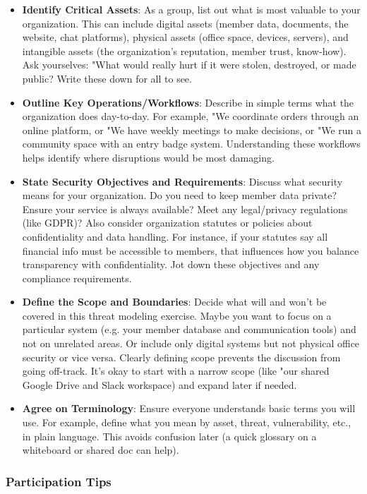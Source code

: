 \begin{itemize}
    \item \textbf{Identify Critical Assets}: As a group, list out what is most
valuable to your organization. This can include digital assets (member data,
documents, the website, chat platforms), physical assets (office space, devices,
servers), and intangible assets (the organization's reputation, member trust, know-how).
Ask yourselves: "What would really hurt if it were stolen, destroyed, or made
public? Write these down for all to see.
    \item \textbf{Outline Key Operations/Workflows}: Describe in simple terms
what the organization does day-to-day. For example, "We coordinate orders through an
online platform, or "We have weekly meetings to make decisions, or "We run a
community space with an entry badge system. Understanding these workflows helps
identify where disruptions would be most damaging.
    \item \textbf{State Security Objectives and Requirements}: Discuss what
security means for your organization. Do you need to keep member data private? Ensure
your service is always available? Meet any legal/privacy regulations (like
GDPR)? Also consider organization statutes or policies about confidentiality and data
handling. For instance, if your statutes say all financial info must be accessible
to members, that influences how you balance transparency with confidentiality.
Jot down these objectives and any compliance requirements.
    \item \textbf{Define the Scope and Boundaries}: Decide what will and won't
be covered in this threat modeling exercise. Maybe you want to focus on a
particular system (e.g. your member database and communication tools) and not on
unrelated areas. Or include only digital systems but not physical office
security or vice versa. Clearly defining scope prevents the discussion from
going off-track. It's okay to start with a narrow scope (like "our shared Google
Drive and Slack workspace) and expand later if needed.
    \item \textbf{Agree on Terminology}: Ensure everyone understands basic terms
you will use. For example, define what you mean by asset, threat, vulnerability,
etc., in plain language. This avoids confusion later (a quick glossary on a
whiteboard or shared doc can help).
\end{itemize}

\subsubsection{Participation Tips}

